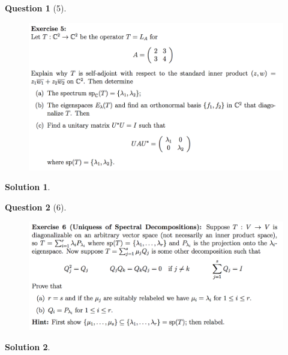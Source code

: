 \documentclass{article} %
\theoremstyle{quest}
\newtheorem*{question}{Question}
\newtheorem*{solution}{Solution}
\begin{document}
\pagebreak

\begin{question}[5]
\hfill
\begin{figure}[h!]
  \centering
    \includegraphics[width=1\textwidth]{LA-1-5.png}
\end{figure}
\end{question}
\begin{solution}
\end{solution}

\pagebreak

\begin{question}[6]
\hfill
\begin{figure}[h!]
  \centering
    \includegraphics[width=1\textwidth]{LA-1-6.png}
\end{figure}
\end{question}
\begin{solution}
\end{solution}
\end{document}
